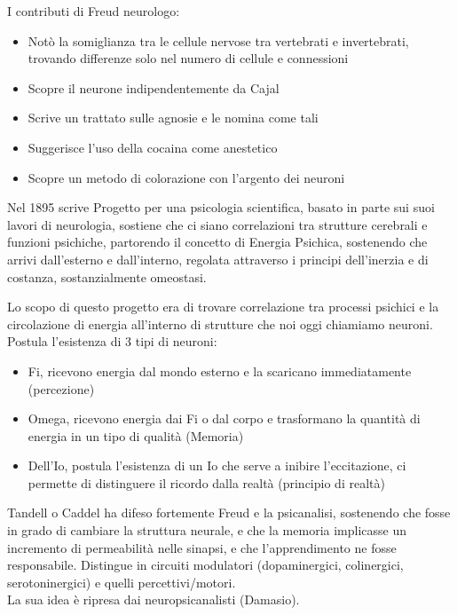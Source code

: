 \documentclass[
]{article}
\providecommand{\tightlist}{%
  \setlength{\itemsep}{0pt}\setlength{\parskip}{0pt}}
\begin{document}
I contributi di Freud neurologo:

\begin{itemize}
\tightlist
\item
  Notò la somiglianza tra le cellule nervose tra vertebrati e
  invertebrati, trovando differenze solo nel numero di cellule e
  connessioni
\item
  Scopre il neurone indipendentemente da Cajal
\item
  Scrive un trattato sulle agnosie e le nomina come tali
\item
  Suggerisce l'uso della cocaina come anestetico
\item
  Scopre un metodo di colorazione con l'argento dei neuroni
\end{itemize}

Nel 1895 scrive Progetto per una psicologia scientifica, basato in parte
sui suoi lavori di neurologia, sostiene che ci siano correlazioni tra
strutture cerebrali e funzioni psichiche, partorendo il concetto di
Energia Psichica, sostenendo che arrivi dall'esterno e dall'interno,
regolata attraverso i principi dell'inerzia e di costanza,
sostanzialmente omeostasi.

Lo scopo di questo progetto era di trovare correlazione tra processi
psichici e la circolazione di energia all'interno di strutture che noi
oggi chiamiamo neuroni.\\
Postula l'esistenza di 3 tipi di neuroni:

\begin{itemize}
\tightlist
\item
  Fi, ricevono energia dal mondo esterno e la scaricano immediatamente
  (percezione)
\item
  Omega, ricevono energia dai Fi o dal corpo e trasformano la quantità
  di energia in un tipo di qualità (Memoria)
\item
  Dell'Io, postula l'esistenza di un Io che serve a inibire
  l'eccitazione, ci permette di distinguere il ricordo dalla realtà
  (principio di realtà)
\end{itemize}

Tandell o Caddel ha difeso fortemente Freud e la psicanalisi, sostenendo
che fosse in grado di cambiare la struttura neurale, e che la memoria
implicasse un incremento di permeabilità nelle sinapsi, e che
l'apprendimento ne fosse responsabile. Distingue in circuiti modulatori
(dopaminergici, colinergici, serotoninergici) e quelli
percettivi/motori.\\
La sua idea è ripresa dai neuropsicanalisti (Damasio).
\end{document}
